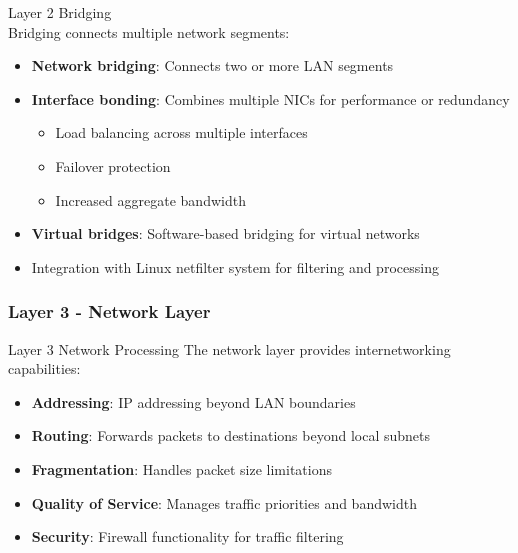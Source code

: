 \begin{concept}{Layer 2 Bridging}\\
    Bridging connects multiple network segments:
    \begin{itemize}
        \item \textbf{Network bridging}: Connects two or more LAN segments
        \item \textbf{Interface bonding}: Combines multiple NICs for performance or redundancy
            \begin{itemize}
                \item Load balancing across multiple interfaces
                \item Failover protection
                \item Increased aggregate bandwidth
            \end{itemize}
        \item \textbf{Virtual bridges}: Software-based bridging for virtual networks
        \item Integration with Linux netfilter system for filtering and processing
    \end{itemize}
\end{concept}

\multend

\subsubsection{Layer 3 - Network Layer}


\begin{definition}{Layer 3 Network Processing}
    The network layer provides internetworking capabilities:
    \begin{itemize}
        \item \textbf{Addressing}: IP addressing beyond LAN boundaries
        \item \textbf{Routing}: Forwards packets to destinations beyond local subnets
        \item \textbf{Fragmentation}: Handles packet size limitations
        \item \textbf{Quality of Service}: Manages traffic priorities and bandwidth
        \item \textbf{Security}: Firewall functionality for traffic filtering
    \end{itemize}
\end{definition}


